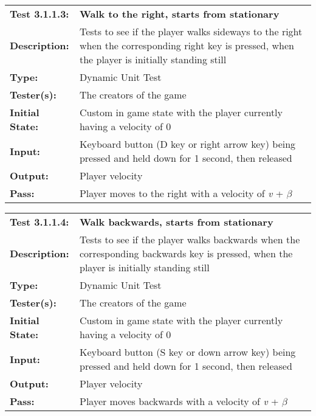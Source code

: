 \documentclass[12pt, titlepage]{article}
\begin{document}
\begin{mdframed}[linewidth=1pt]
\begin{tabularx}{\textwidth}{@{}p{3cm}X@{}}
{\bf Test 3.1.1.3:} & {\bf Walk to the right, starts from stationary}\\[\baselineskip]
{\bf Description:} & Tests to see if the player walks sideways to the right when the corresponding right key is pressed, when the player is initially standing still\\[0.5\baselineskip]
{\bf Type:} & Dynamic Unit Test\\[0.5\baselineskip]
{\bf Tester(s):} & The creators of the game\\[0.5\baselineskip]
{\bf Initial State:} & Custom in game state with the player currently having a velocity of 0\\[0.5\baselineskip]
{\bf Input:} & Keyboard button (D key or right arrow key) being pressed and held down for 1 second, then released\\[0.5\baselineskip]
{\bf Output:} & Player velocity\\[0.5\baselineskip]
{\bf Pass:} & Player moves to the right with a velocity of \textit{v} + $\beta$
\end{tabularx}
\end{mdframed}

\begin{mdframed}[linewidth=1pt]
\begin{tabularx}{\textwidth}{@{}p{3cm}X@{}}
{\bf Test 3.1.1.4:} & {\bf Walk backwards, starts from stationary}\\[\baselineskip]
{\bf Description:} & Tests to see if the player walks backwards when the corresponding backwards key is pressed, when the player is initially standing still\\[0.5\baselineskip]
{\bf Type:} & Dynamic Unit Test\\[0.5\baselineskip]
{\bf Tester(s):} & The creators of the game\\[0.5\baselineskip]
{\bf Initial State:} & Custom in game state with the player currently having a velocity of 0\\[0.5\baselineskip]
{\bf Input:} & Keyboard button (S key or down arrow key) being pressed and held down for 1 second, then released\\[0.5\baselineskip]
{\bf Output:} & Player velocity\\[0.5\baselineskip]
{\bf Pass:} & Player moves backwards with a velocity of \textit{v} + $\beta$
\end{tabularx}
\end{mdframed}
\end{document}
